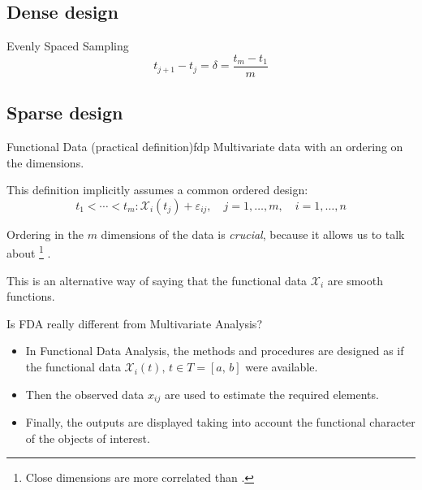 \subsection{Dense design}

\begin{definition}{Evenly Spaced Sampling}{}
	\begin{equation*}
		t_{j+1} - t_j = \delta = \frac{t_m - t_1}{m}
	\end{equation*}
\end{definition}

\subsection{Sparse design}


\begin{definition}{Functional Data (practical definition)}{fdp}
	Multivariate data with an ordering on the dimensions.

	This definition implicitly assumes a common ordered design:
	\begin{equation*}
		t_1 < \cdots < t_m :  \mathcal X_i (t_j) + \varepsilon_{ij},\quad
		j=1,\ldots,m,\quad i=1,\ldots,n
	\end{equation*}
	\tcblower
	\begin{note}
		Ordering in the $m$ dimensions of the data is \emph{crucial},
		because it allows us to talk about %
		\footnote{Close dimensions are more correlated than .}%
		.
	\end{note}
	\begin{note}
		This is an alternative way of saying that the functional data
		$\mathcal X_i$ are smooth functions.
	\end{note}
\end{definition}

\begin{question*}
	{Is FDA really different from Multivariate Analysis?}
	\begin{itemize}
		\item In Functional Data Analysis, the methods and procedures are
		      designed as if the functional data $\mathcal X_i(t),\,t\in T=[a,\,b]$
		      were available.
		\item Then the observed data $x_{ij}$ are used to estimate the required
		      elements.
		\item Finally, the outputs are displayed taking into account the functional
		      character of the objects of interest.
	\end{itemize}
\end{question*}



